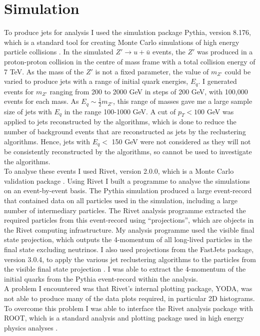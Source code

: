 \documentclass[a4paper,11pt, onecolumn]{article}
\begin{document}
\section{Simulation} 

  To produce jets for analysis I used the simulation package Pythia, version 8.176, which is a standard tool for creating Monte Carlo simulations of high energy particle 
  collisions  \cite{Pythia}. In the simulated $Z' \to u + \bar{u}$ events, the $Z'$ was produced in a proton-proton collision in the centre of mass frame with a total collision
  energy of 7 TeV. As the mass of the $Z'$ is not a fixed parameter, the value of $m_{Z'}$ could be varied to produce jets with a range of initial quark energies, 
  $E_q$. I generated events for $m_{Z'}$ ranging from 200 to 2000 GeV in steps of 200 GeV, with 100,000 events for each mass. As $E_q \sim \frac{1}{2}m_{Z'}$,
  this range of masses gave me a large sample size of jets with $E_q$ in the range 100-1000 GeV. A cut of $p_T < 100$ GeV was applied to jets reconstructed by
  the algorithms, which is done to reduce the number of background events that are reconstructed as jets by the reclustering algorithms.
  Hence, jets with $E_q <$ 150 GeV were not considered as they will not be consistently reconstructed by the algorithms, so cannot be used to investigate the algorithms. \\

  To analyse these events I used Rivet, version 2.0.0, which is a Monte Carlo validation package \cite{Rivet}.
  Using Rivet I built a programme to analyse the simulations on an event-by-event basis. The Pythia simulation produced a large event-record that contained 
  data on all particles used in the simulation, including a large number of intermediary particles. The Rivet analysis programme extracted the required 
  particles from this event-record using ``projections'', which are objects in the Rivet computing infrastructure. 
  My analysis programme used the visible final state projection, which outputs the 4-momentum of all long-lived particles in the final state excluding neutrinos. I also used
  projections from the FastJets package, version 3.0.4, to apply the various jet reclustering algorithms to the particles from the visible final state projection \cite{FastJets}.
  I was able to extract the 4-momentum of the initial quarks from the Pythia event-record within the analysis.\\

  A problem I encountered was that Rivet's internal plotting package, YODA, was not able to produce many of the data plots required,
  in particular 2D histograms. To overcome this problem I was able to interface the Rivet analysis package with ROOT, which is a standard analysis and plotting 
  package used in high energy physics analyses \cite{ROOT}. 
\end{document}

